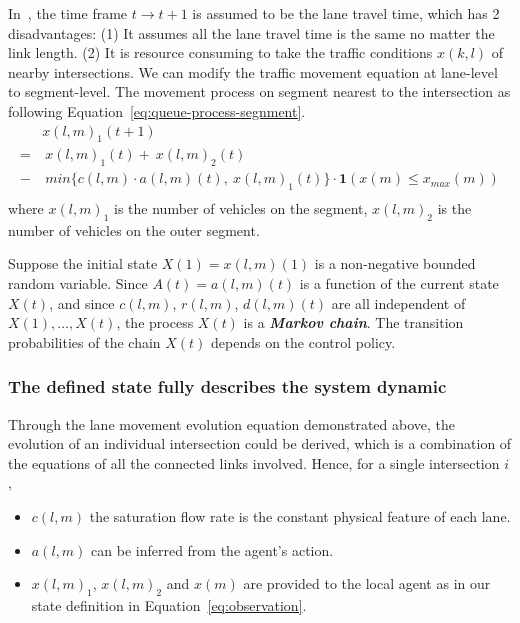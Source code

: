 In~\cite{MP13}, the time frame $t\rightarrow t+1$ is assumed to be the lane travel time, which has 2 disadvantages: (1) It assumes all the lane travel time is the same no matter the link length. (2) It is resource consuming to take the traffic conditions $x(k,l)$ of nearby intersections. We can modify  the traffic movement equation at lane-level to segment-level.  The movement process on segment nearest to the intersection as following Equation~\ref{eq:queue-process-segnment}.
\begin{equation}
\begin{split}
\label{eq:queue-process-segnment}
      & x(l,m)_1(t+1) \\
    = &\ x(l,m)_1(t) + \ x(l,m)_2(t)\\
    - &\ min\{c(l,m)\cdot a(l,m)(t),\ x(l,m)_1(t)\}\cdot \mathbf{1}(x(m)\le x_{max}(m)) \\
\end{split}
\end{equation}
 where $x(l,m)_1$ is the number of vehicles on the segment, $x(l,m)_2$ is the number of vehicles on the outer segment.
 
Suppose the initial state $X(1)={x(l,m)(1)}$ is a non-negative bounded random variable. Since $A(t)={a(l,m)(t)}$ is a function of the current state $X(t)$, and since $c(l,m)$, $r(l,m)$, $d(l,m)(t)$ are all independent of $X(1),...,X(t)$, the process $X(t)$ is a \textit{\textbf{Markov chain}}. The transition probabilities of the chain $X(t)$ depends on the control policy.
 


\subsubsection{The defined state fully describes the system dynamic}
Through the lane movement evolution equation demonstrated above, the evolution of an individual intersection could be derived, which is a combination of the equations of all the connected links involved. Hence, for a single intersection $i$, 
\begin{itemize}
\item $c(l,m)$ the saturation flow rate is the constant physical feature of each lane.
\item $a(l,m)$ can be inferred from the agent's action.
\item $x(l,m)_1$, $x(l,m)_2$ and $x(m)$ are provided to the local agent as in our state definition in Equation~\ref{eq:observation}.

\end{itemize}


